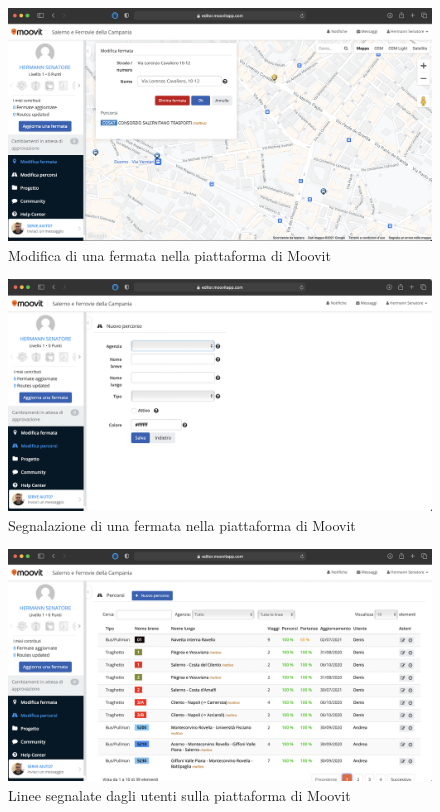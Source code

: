         \begin{figure}[H]
            \includegraphics[width=\columnwidth]{capitolo2/figure/modificaFermata.png}
            \caption{Modifica di una fermata nella piattaforma di Moovit}
            \label{Modifica di una fermata nella piattaforma di Moovit}
        \end{figure}

        \begin{figure}[H]
            \includegraphics[width=\columnwidth]{capitolo2/figure/nuovoPercorso.png}
            \caption{Segnalazione di una fermata nella piattaforma di Moovit}
            \label{Segnalazione di una fermata nella piattaforma di Moovit}
        \end{figure}

        \begin{figure}[H]
            \includegraphics[width=\columnwidth]{capitolo2/figure/tuttiPercorsi.png}
            \caption{Linee segnalate dagli utenti sulla piattaforma di Moovit}
            \label{Linee segnalate dagli utenti sulla piattaforma di Moovit}
        \end{figure}

